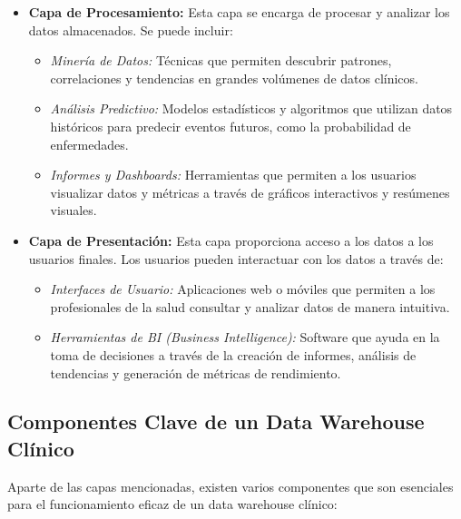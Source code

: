 \documentclass[12pt, a4paper, twoside]{article}
\begin{document}
\begin{itemize}
		\item \textbf{Capa de Procesamiento:} Esta capa se encarga de procesar y analizar los datos almacenados. Se puede incluir:
		\begin{itemize}
			\item \textit{Minería de Datos:} Técnicas que permiten descubrir patrones, correlaciones y tendencias en grandes volúmenes de datos clínicos.
			\item \textit{Análisis Predictivo:} Modelos estadísticos y algoritmos que utilizan datos históricos para predecir eventos futuros, como la probabilidad de enfermedades.
			\item \textit{Informes y Dashboards:} Herramientas que permiten a los usuarios visualizar datos y métricas a través de gráficos interactivos y resúmenes visuales.
		\end{itemize}
		
		\item \textbf{Capa de Presentación:} Esta capa proporciona acceso a los datos a los usuarios finales. Los usuarios pueden interactuar con los datos a través de:
		\begin{itemize}
			\item \textit{Interfaces de Usuario:} Aplicaciones web o móviles que permiten a los profesionales de la salud consultar y analizar datos de manera intuitiva.
			\item \textit{Herramientas de BI (Business Intelligence):} Software que ayuda en la toma de decisiones a través de la creación de informes, análisis de tendencias y generación de métricas de rendimiento.
		\end{itemize}
	\end{itemize}
	
	\subsection{Componentes Clave de un Data Warehouse Clínico}
	
	Aparte de las capas mencionadas, existen varios componentes que son esenciales para el funcionamiento eficaz de un data warehouse clínico:
	
\end{document}
